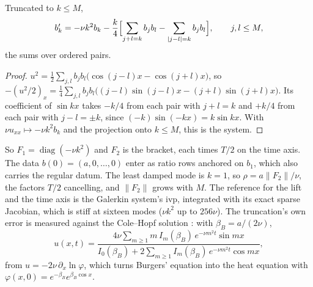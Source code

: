 \begin{proposition}
\label{prop:burgers-galerkin}
Truncated to $k\le M$,
\begin{equation}
    b_k'=-\nu k^2b_k-\frac k4\Bigl[\sum_{j+l=k}b_jb_l-\sum_{|j-l|=k}b_jb_l\Bigr],\qquad j,l\le M,
\end{equation}
the sums over ordered pairs.
\end{proposition}
\begin{proof}
$u^2=\tfrac12\sum_{j,l}b_jb_l\bigl(\cos(j-l)x-\cos(j+l)x\bigr)$, so $-(u^2/2)_x=\tfrac14\sum_{j,l}b_jb_l\bigl((j-l)\sin(j-l)x-(j+l)\sin(j+l)x\bigr)$. Its coefficient of $\sin kx$ takes $-k/4$ from each pair with $j+l=k$ and $+k/4$ from each pair with $j-l=\pm k$, since $(-k)\sin(-kx)=k\sin kx$. With $\nu u_{xx}\mapsto-\nu k^2b_k$ and the projection onto $k\le M$, this is the system.
\end{proof}
So $F_1=\operatorname{diag}(-\nu k^2)$ and $F_2$ is the bracket, each times $T/2$ on the time axis. The data $b(0)=(a,0,\dots,0)$ enter as ratio rows anchored on $b_1$, which also carries the regular datum. The least damped mode is $k=1$, so $\rho=a\|F_2\|/\nu$, the factors $T/2$ cancelling, and $\|F_2\|$ grows with $M$. The reference for the lift and the time axis is the Galerkin system's \gls{ivp}, integrated with its exact sparse Jacobian, which is stiff at sixteen modes ($\nu k^2$ up to $256\nu$). The truncation's own error is measured against the Cole--Hopf solution \cite{hopf1950burgers,cole1951burgers}: with $\beta_B=a/(2\nu)$,
\begin{equation}
    u(x,t)=\frac{4\nu\sum_{m\ge1}m\,I_m(\beta_B)\,e^{-\nu m^2t}\sin mx}{I_0(\beta_B)+2\sum_{m\ge1}I_m(\beta_B)\,e^{-\nu m^2t}\cos mx},
\end{equation}
from $u=-2\nu\,\partial_x\ln\varphi$, which turns Burgers' equation into the heat equation with $\varphi(x,0)=e^{-\beta_B}e^{\beta_B\cos x}$.

